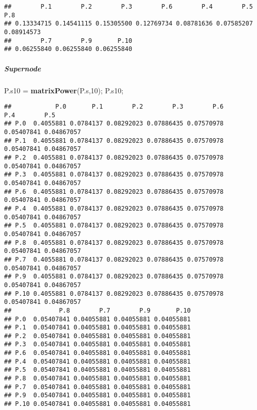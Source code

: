 \documentclass[
]{article}
\newenvironment{Shaded}{\begin{snugshade}}{\end{snugshade}}
\newcommand{\DecValTok}[1]{\textcolor[rgb]{0.00,0.00,0.81}{#1}}
\newcommand{\KeywordTok}[1]{\textcolor[rgb]{0.13,0.29,0.53}{\textbf{#1}}}
\newcommand{\NormalTok}[1]{#1}
\newcommand{\StringTok}[1]{\textcolor[rgb]{0.31,0.60,0.02}{#1}}
\begin{document}
\begin{verbatim}
##        P.1        P.2        P.3        P.6        P.4        P.5        P.8 
## 0.13334715 0.14541115 0.15305500 0.12769734 0.08781636 0.07585207 0.08914573 
##        P.7        P.9       P.10 
## 0.06255840 0.06255840 0.06255840
\end{verbatim}

\hypertarget{supernode}{%
\subparagraph{Supernode}\label{supernode}}

\begin{Shaded}
\begin{Highlighting}[]
\NormalTok{P.s10 =}\StringTok{ }\KeywordTok{matrixPower}\NormalTok{(P.s,}\DecValTok{10}\NormalTok{);}
\NormalTok{P.s10;}
\end{Highlighting}
\end{Shaded}

\begin{verbatim}
##            P.0       P.1        P.2        P.3        P.6        P.4        P.5
## P.0  0.4055881 0.0784137 0.08292023 0.07886435 0.07570978 0.05407841 0.04867057
## P.1  0.4055881 0.0784137 0.08292023 0.07886435 0.07570978 0.05407841 0.04867057
## P.2  0.4055881 0.0784137 0.08292023 0.07886435 0.07570978 0.05407841 0.04867057
## P.3  0.4055881 0.0784137 0.08292023 0.07886435 0.07570978 0.05407841 0.04867057
## P.6  0.4055881 0.0784137 0.08292023 0.07886435 0.07570978 0.05407841 0.04867057
## P.4  0.4055881 0.0784137 0.08292023 0.07886435 0.07570978 0.05407841 0.04867057
## P.5  0.4055881 0.0784137 0.08292023 0.07886435 0.07570978 0.05407841 0.04867057
## P.8  0.4055881 0.0784137 0.08292023 0.07886435 0.07570978 0.05407841 0.04867057
## P.7  0.4055881 0.0784137 0.08292023 0.07886435 0.07570978 0.05407841 0.04867057
## P.9  0.4055881 0.0784137 0.08292023 0.07886435 0.07570978 0.05407841 0.04867057
## P.10 0.4055881 0.0784137 0.08292023 0.07886435 0.07570978 0.05407841 0.04867057
##             P.8        P.7        P.9       P.10
## P.0  0.05407841 0.04055881 0.04055881 0.04055881
## P.1  0.05407841 0.04055881 0.04055881 0.04055881
## P.2  0.05407841 0.04055881 0.04055881 0.04055881
## P.3  0.05407841 0.04055881 0.04055881 0.04055881
## P.6  0.05407841 0.04055881 0.04055881 0.04055881
## P.4  0.05407841 0.04055881 0.04055881 0.04055881
## P.5  0.05407841 0.04055881 0.04055881 0.04055881
## P.8  0.05407841 0.04055881 0.04055881 0.04055881
## P.7  0.05407841 0.04055881 0.04055881 0.04055881
## P.9  0.05407841 0.04055881 0.04055881 0.04055881
## P.10 0.05407841 0.04055881 0.04055881 0.04055881
\end{verbatim}
\end{document}
